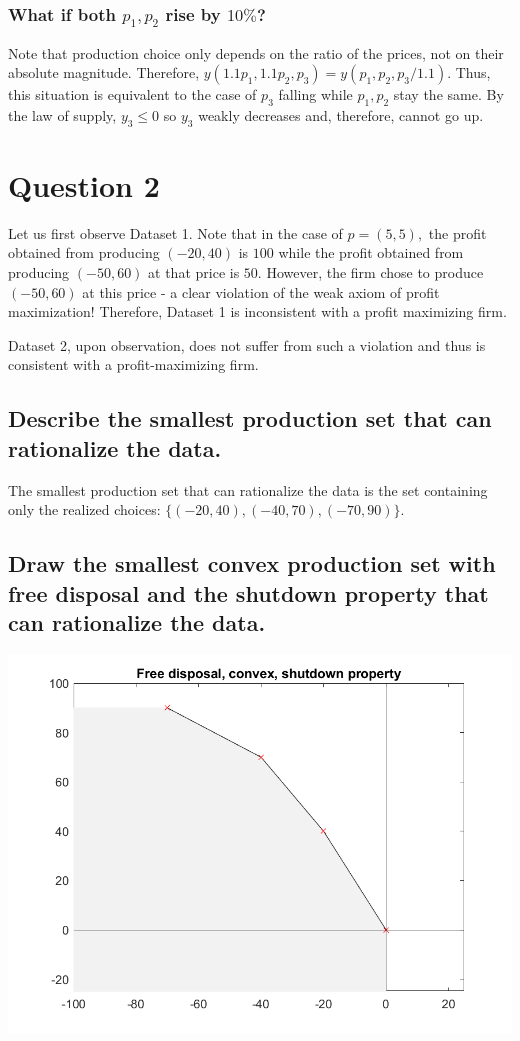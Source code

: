 \documentclass[11pt]{article} %
\begin{document}
\subsubsection{What if both $p_1,p_2$ rise by $10\%$?}
Note that production choice only depends on the ratio of the prices, not on their absolute magnitude. Therefore, $y(1.1 p_1,1.1 p_2,p_3) = y(p_1,p_2,p_3 /1.1) $. Thus, this situation is equivalent to the case of $p_3$ falling while $p_1,p_2$ stay the same. By the law of supply, $y_3 \leq 0$ so $y_3$ weakly decreases and, therefore, cannot go up.

\section{Question 2}
Let us first observe Dataset 1. Note that in the case of $p=(5,5),$ the profit obtained from producing $(-20,40)$ is $100$ while the profit obtained from producing $(-50,60)$ at that price is $50$. However, the firm chose to produce $(-50,60)$ at this price - a clear violation of the weak axiom of profit maximization! Therefore, Dataset 1 is inconsistent with a profit maximizing firm.

Dataset 2, upon observation, does not suffer from such a violation and thus is consistent with a profit-maximizing firm. 
\subsection{Describe the smallest production set that can rationalize the data.}
The smallest production set that can rationalize the data is the set containing only the realized choices: $\{ (-20,40),(-40,70),(-70,90)\}$.

\subsection{Draw the smallest convex production set with free disposal and the shutdown property that can rationalize the data.}
\includegraphics{freedispshutdown}
\end{document}
